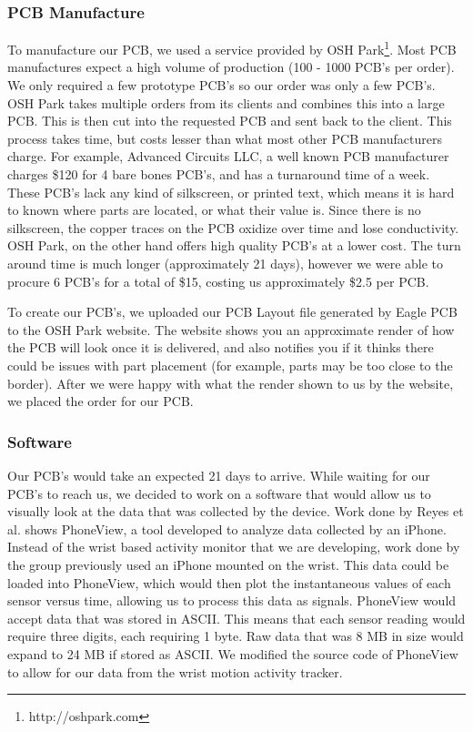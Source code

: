 \subsubsection{PCB Manufacture}
To manufacture our PCB, we used a service provided by OSH Park\footnote{http://oshpark.com}.
Most PCB manufactures expect a high volume of production (100 - 1000 PCB's per order).
We only required a few prototype PCB's so our order was only a few PCB's.
OSH Park takes multiple orders from its clients and combines this into a large PCB.
This is then cut into the requested PCB and sent back to the client.
This process takes time, but costs lesser than what most other PCB manufacturers charge.
For example,
Advanced Circuits LLC,
a well known PCB manufacturer charges \$120 for 4 bare bones PCB's,
and has a turnaround time of a week.
These PCB's lack any kind of silkscreen,
or printed text,
which means it is hard to known where parts are located,
or what their value is.
Since there is no silkscreen,
the copper traces on the PCB oxidize over time and lose conductivity.
OSH Park,
on the other hand offers high quality PCB's at a lower cost.
The turn around time is much longer (approximately 21 days),
however we were able to procure 6 PCB's for a total of \$15,
costing us approximately \$2.5 per PCB.

To create our PCB's, we uploaded our PCB Layout file generated by Eagle PCB to the OSH Park website.
The website shows you an approximate render of how the PCB will look once it is delivered,
and also notifies you if it thinks there could be issues with part placement (for example, parts may be too close to the border).
After we were happy with what the render shown to us by the website,
we placed the order for our PCB.

\subsubsection{Software}
\label{Sec:Software}
Our PCB's would take an expected 21 days to arrive. While waiting for our PCB's to reach us,
we decided to work on a software that would allow us to visually look at the data that was collected by the device.
Work done by Reyes et al. \cite{concha2014study} shows PhoneView,
a tool developed to analyze data collected by an iPhone.
Instead of the wrist based activity monitor that we are developing,
work done by the group previously used an iPhone mounted on the wrist.
This data could be loaded into PhoneView,
which would then plot the instantaneous values of each sensor versus time,
allowing us to process this data as signals.
PhoneView would accept data that was stored in ASCII.
This means that each sensor reading would require three digits,
each requiring 1 byte.
Raw data that was 8 MB in size would expand to 24 MB if stored as ASCII.
We modified the source code of PhoneView to allow for our data from the wrist motion activity tracker.

